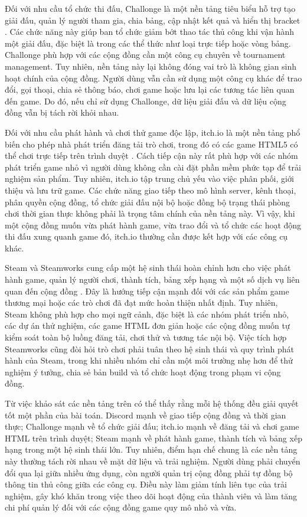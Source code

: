 \documentclass[../DoAn.tex]{subfiles}
\begin{document}
Đối với nhu cầu tổ chức thi đấu, Challonge là một nền tảng tiêu biểu hỗ trợ tạo giải đấu, quản lý người tham gia, chia bảng, cập nhật kết quả và hiển thị bracket \cite{challonge-api}. Các chức năng này giúp ban tổ chức giảm bớt thao tác thủ công khi vận hành một giải đấu, đặc biệt là trong các thể thức như loại trực tiếp hoặc vòng bảng. Challonge phù hợp với các cộng đồng cần một công cụ chuyên về tournament management. Tuy nhiên, nền tảng này lại không đóng vai trò là không gian sinh hoạt chính của cộng đồng. Người dùng vẫn cần sử dụng một công cụ khác để trao đổi, gọi thoại, chia sẻ thông báo, chơi game hoặc lưu lại các tương tác liên quan đến game. Do đó, nếu chỉ sử dụng Challonge, dữ liệu giải đấu và dữ liệu cộng đồng vẫn bị tách rời khỏi nhau.

Đối với nhu cầu phát hành và chơi thử game độc lập, itch.io là một nền tảng phổ biến cho phép nhà phát triển đăng tải trò chơi, trong đó có các game HTML5 có thể chơi trực tiếp trên trình duyệt \cite{itchio-html5}. Cách tiếp cận này rất phù hợp với các nhóm phát triển game nhỏ vì người dùng không cần cài đặt phần mềm phức tạp để trải nghiệm sản phẩm. Tuy nhiên, itch.io tập trung chủ yếu vào việc phân phối, giới thiệu và lưu trữ game. Các chức năng giao tiếp theo mô hình server, kênh thoại, phân quyền cộng đồng, tổ chức giải đấu nội bộ hoặc đồng bộ trạng thái phòng chơi thời gian thực không phải là trọng tâm chính của nền tảng này. Vì vậy, khi một cộng đồng muốn vừa phát hành game, vừa trao đổi và tổ chức các hoạt động thi đấu xung quanh game đó, itch.io thường cần được kết hợp với các công cụ khác.

Steam và Steamworks cung cấp một hệ sinh thái hoàn chỉnh hơn cho việc phát hành game, quản lý người chơi, thành tích, bảng xếp hạng và một số dịch vụ liên quan đến cộng đồng \cite{steamworks-docs}. Đây là hướng tiếp cận mạnh đối với các sản phẩm game thương mại hoặc các trò chơi đã đạt mức hoàn thiện nhất định. Tuy nhiên, Steam không phù hợp cho mọi ngữ cảnh, đặc biệt là các nhóm phát triển nhỏ, các dự án thử nghiệm, các game HTML đơn giản hoặc các cộng đồng muốn tự kiểm soát toàn bộ luồng đăng tải, chơi thử và tương tác nội bộ. Việc tích hợp Steamworks cũng đòi hỏi trò chơi phải tuân theo hệ sinh thái và quy trình phát hành của Steam, trong khi nhiều nhóm chỉ cần một môi trường nhẹ hơn để thử nghiệm ý tưởng, chia sẻ bản build và tổ chức hoạt động trong phạm vi cộng đồng.

Từ việc khảo sát các nền tảng trên có thể thấy rằng mỗi hệ thống đều giải quyết tốt một phần của bài toán. Discord mạnh về giao tiếp cộng đồng và thời gian thực; Challonge mạnh về tổ chức giải đấu; itch.io mạnh về đăng tải và chơi game HTML trên trình duyệt; Steam mạnh về phát hành game, thành tích và bảng xếp hạng trong một hệ sinh thái lớn. Tuy nhiên, điểm hạn chế chung là các nền tảng này thường tách rời nhau về mặt dữ liệu và trải nghiệm. Người dùng phải chuyển đổi qua lại giữa nhiều ứng dụng, còn người quản trị cộng đồng phải tự đồng bộ thông tin thủ công giữa các công cụ. Điều này làm giảm tính liên tục của trải nghiệm, gây khó khăn trong việc theo dõi hoạt động của thành viên và làm tăng chi phí quản lý đối với các cộng đồng game quy mô nhỏ và vừa.
\end{document}
